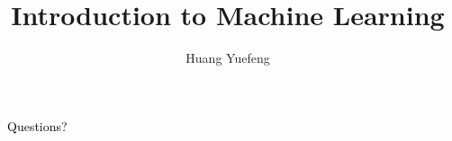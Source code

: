 
\def\allfiles{allfiles}

\author{Huang Yuefeng}
\title{Introduction to Machine Learning}




\frame{

	\titlepage
}
\setcounter{tocdepth}{1}

%










%


\begin{frame}
\
\centering \Large \textcolor{black}{Questions?}

\end{frame}
\usebackgroundtemplate{}



